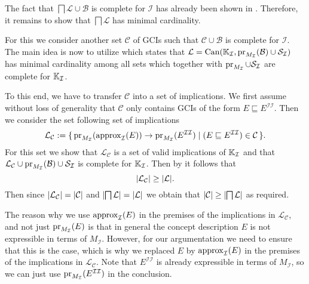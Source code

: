 The fact that $\bigsqcap \mathcal{L} \cup \mathcal{B}$ is complete for $\mathcal{I}$ has
already been shown in .  Therefore, it remains to
show that $\bigsqcap \mathcal{L}$ has minimal cardinality.

For this we consider another set $\mathcal{C}$ of GCIs such that $\mathcal{C} \cup
\mathcal{B}$ is complete for $\mathcal{I}$.  The main idea is now to utilize
 which states that
$\mathcal{L} = \operatorname{Can}({\mathbb{K}}_{\mathcal{I}}, \operatorname{pr}_{M_{\mathcal{I}}}(\mathcal{B}) \cup
\mathcal{S}_{\mathcal{I}})$ has minimal cardinality among all sets which together with
$\operatorname{pr}_{M_{\mathcal{I}}} \cup \mathcal{S}_{\mathcal{I}}$ are complete for ${\mathbb{K}}_{\mathcal{I}}$.

To this end, we have to transfer $\mathcal{C}$ into a set of implications.  We first
assume without loss of generality that $\mathcal{C}$ only contains GCIs of the form $E
\sqsubseteq E^{\mathcal{I}\mathcal{I}}$.  Then we consider the set following set of
implications
\begin{equation*}
  \mathcal{L}_{\mathcal{C}} := {\{\, \operatorname{pr}_{M_{\mathcal{I}}}(\operatorname{approx}_{\mathcal{I}}(E)) \to
    \operatorname{pr}_{M_{\mathcal{I}}}(E^{\mathcal{I}\mathcal{I}}) \mid (E \sqsubseteq
    E^{\mathcal{I}\mathcal{I}}) \in \mathcal{C} \,\}}.
\end{equation*}
For this set we show that $\mathcal{L}_{\mathcal{C}}$ is a set of valid implications of
${\mathbb{K}}_{\mathcal{I}}$ and that $\mathcal{L}_{\mathcal{C}} \cup
\operatorname{pr}_{M_{\mathcal{I}}}(\mathcal{B}) \cup \mathcal{S}_{\mathcal{I}}$ is complete for ${\mathbb{K}}_{\mathcal{I}}$.  Then by 
it follows that
\begin{equation*}
  \lvert\mathcal{L}_{\mathcal{C}}\rvert \ge \lvert \mathcal{L} \rvert.
\end{equation*}
Then since $\lvert \mathcal{L}_{\mathcal{C}} \rvert = \lvert \mathcal{C} \rvert$ and $\lvert \bigsqcap
  \mathcal{L} \rvert = \lvert \mathcal{L} \rvert$ we obtain that $\lvert \mathcal{C} \rvert \ge \lvert
  \bigsqcap \mathcal{L} \rvert$ as required.

The reason why we use $\operatorname{approx}_{\mathcal{I}}(E)$ in the premises of the implications in
$\mathcal{L}_{\mathcal{C}}$, and not just $\operatorname{pr}_{M_{\mathcal{I}}}(E)$ is that in general
the concept description $E$ is not expressible in terms of $M_{\mathcal{I}}$.  However,
for our argumentation we need to ensure that this is the case, which is why we replaced
$E$ by $\operatorname{approx}_{\mathcal{I}}(E)$ in the premises of the implications in
$\mathcal{L}_{\mathcal{C}}$.  Note that $E^{\mathcal{I}\mathcal{I}}$ is already
expressible in terms of $M_{\mathcal{I}}$, so we can just use
$\operatorname{pr}_{M_{\mathcal{I}}}(E^{\mathcal{I}\mathcal{I}})$ in the conclusion.

